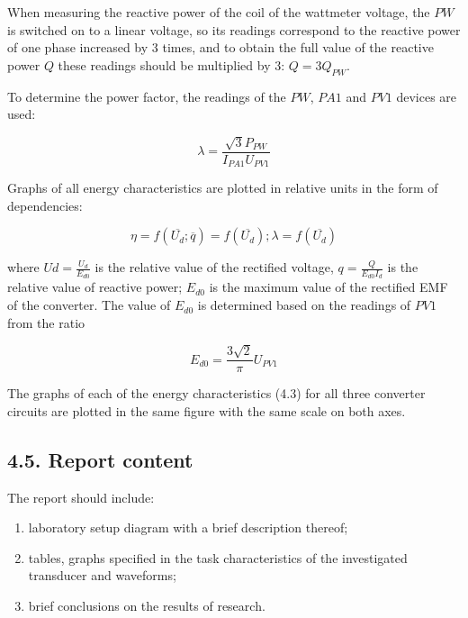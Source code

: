 \documentclass[a4paper,14pt]{article}
\begin{document}
\begin{enumerate}
When measuring the reactive power of the coil of the wattmeter voltage, the $PW$ is switched on to a linear voltage, 
so its readings correspond to the reactive power of one phase increased by 3 times, and to obtain the full value of the reactive power $Q$ these readings should be multiplied by 3: $Q = 3 Q_{PW}$.

To determine the power factor, the readings of the $PW$, $PA1$ and $PV1$ devices are used:

$$
		\lambda =\frac{\sqrt{3}P_{PW}}{I_{PA1}U_{PV1}}
$$

Graphs of all energy characteristics are plotted in relative units in the form of dependencies:

$$
		\eta = f(\overline{U_d}; \overline{q}) = f(\overline{U_d}); \lambda = f(\overline{U_d})
$$

where ${\displaystyle Ud = \frac{U_d}{E_{d0}}}$ is the relative value of the rectified voltage, 
${\displaystyle q = \frac{Q}{E_{d0}I_d}}$ is the relative value of reactive power; $E_{d0}$
is the maximum value of the rectified EMF of the converter. 
The value of $E_{d0}$ is determined based on the readings of $PV1$ from the ratio

$$
E_{d0} = \frac{3\sqrt{2}}{\pi} U_{PV1}
$$


The graphs of each of the energy characteristics (4.3) for all three converter circuits are plotted in the same figure with the same scale on both axes.
\end{enumerate}


\subsection{4.5. Report content}

The report should include:
\begin{enumerate}
\item laboratory setup diagram with a brief description thereof;

\item tables, graphs specified in the task characteristics of the investigated
transducer and waveforms;

\item brief conclusions on the results of research.
\end{enumerate}
\end{document}

